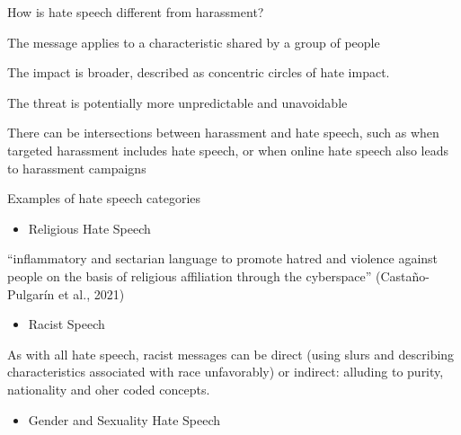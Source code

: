 \documentclass[nobackground,dvipsnames,table]{beamer}
\begin{document}
\begin{frame}{How is hate speech different from harassment?}

    \begin{itemize}
        \small{
        \item The message applies to a characteristic shared by a group of people 
        \item The impact is broader, described as concentric circles of hate impact. 
        \item The threat is potentially more unpredictable and unavoidable
        \item There can be intersections between harassment and hate speech, such as when targeted harassment includes hate speech, or when online hate speech also leads to harassment campaigns}
    \end{itemize}
    

\end{frame}

\begin{frame}{Examples of hate speech categories}

\begin{itemize}
    \item Religious Hate Speech 
\end{itemize}
“inflammatory and sectarian language to promote hatred and violence against people on the basis of religious affiliation through the cyberspace” (Castaño-Pulgarín et al., 2021) 

\begin{itemize}
    \item Racist Speech 
\end{itemize}
As with all hate speech, racist messages can be direct (using slurs and describing characteristics associated with race unfavorably) or indirect: alluding to purity, nationality and oher coded concepts. 

\begin{itemize}
    \item Gender and Sexuality Hate Speech 
\end{itemize}
\end{frame}
\end{document}
